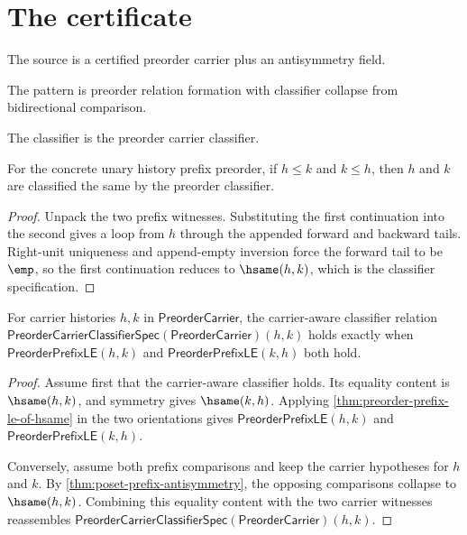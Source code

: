 \section{The certificate}

\begin{definition}
\label{def:poset-source-specification}
The source is a certified preorder carrier plus an antisymmetry field.
\end{definition}

\begin{definition}
\label{def:poset-pattern-specification}
The pattern is preorder relation formation with classifier collapse from bidirectional comparison.
\end{definition}

\begin{definition}
\label{def:poset-classifier-specification}
The classifier is the preorder carrier classifier.
\end{definition}

\begin{theorem}
\label{thm:poset-prefix-antisymmetry}
For the concrete unary history prefix preorder, if \(h\le k\) and \(k\le h\),
then \(h\) and \(k\) are classified the same by the preorder classifier.
\end{theorem}
\begin{proof}
Unpack the two prefix witnesses. Substituting the first continuation into the
second gives a loop from \(h\) through the appended forward and backward tails.
Right-unit uniqueness and append-empty inversion force the forward tail to be
\(\emp\), so the first continuation reduces to \(\hsame(h,k)\), which is the
classifier specification.
\end{proof}

\begin{theorem}
\label{thm:poset-prefix-classifier-exactness}
For carrier histories $h,k$ in $\mathsf{PreorderCarrier}$, the carrier-aware
classifier relation
$\mathsf{PreorderCarrierClassifierSpec}(\mathsf{PreorderCarrier})(h,k)$ holds
exactly when $\mathsf{PreorderPrefixLE}(h,k)$ and
$\mathsf{PreorderPrefixLE}(k,h)$ both hold.
\end{theorem}
\begin{proof}
Assume first that the carrier-aware classifier holds. Its equality content is
$\hsame(h,k)$, and symmetry gives $\hsame(k,h)$. Applying
\autoref{thm:preorder-prefix-le-of-hsame} in the two orientations gives
$\mathsf{PreorderPrefixLE}(h,k)$ and $\mathsf{PreorderPrefixLE}(k,h)$.

Conversely, assume both prefix comparisons and keep the carrier hypotheses for
$h$ and $k$. By \autoref{thm:poset-prefix-antisymmetry}, the opposing
comparisons collapse to $\hsame(h,k)$. Combining this equality content with the
two carrier witnesses reassembles
$\mathsf{PreorderCarrierClassifierSpec}(\mathsf{PreorderCarrier})(h,k)$.
\end{proof}

